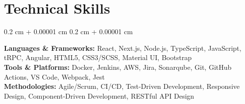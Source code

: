 \documentclass[10pt, letterpaper]{article}
\newenvironment{onecolentry}{
    \begin{adjustwidth}{
        0.2 cm + 0.00001 cm
    }{
        0.2 cm + 0.00001 cm
    }
}{
    \end{adjustwidth}
} %
\begin{document}
    \section{Technical Skills}
    \begin{onecolentry}
        \textbf{Languages \& Frameworks:} React, Next.js, Node.js, TypeScript, JavaScript, tRPC, Angular, HTML5, CSS3/SCSS, Material UI, Bootstrap\\
        \textbf{Tools \& Platforms:} Docker, Jenkins, AWS, Jira, Sonarqube, Git, GitHub Actions, VS Code, Webpack, Jest \\
        \textbf{Methodologies:} Agile/Scrum, CI/CD, Test-Driven Development, Responsive Design, Component-Driven Development, RESTful API Design
    \end{onecolentry}
\end{document}
